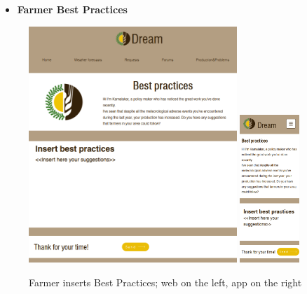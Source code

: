 \documentclass{article}
\begin{document}
    \begin{itemize}
        \item \textbf{Farmer Best Practices}
    \end{itemize}
        \begin{figure} [h]
            \centering
            \includegraphics[width=0.7\textwidth]{images/UserInterfaces/Farmer/BestPractices/InsertBestPracticesWeb.png}
            \quad
            \includegraphics[width=0.2\textwidth]{images/UserInterfaces/Farmer/BestPractices/InsertBestPracticesApp.png}
            \quad
            \caption{\label{fig:farmerBestPractices}Farmer inserts Best Practices; web on the left, app on the right}
        \end{figure}
        
    \newpage
    
\end{document}
